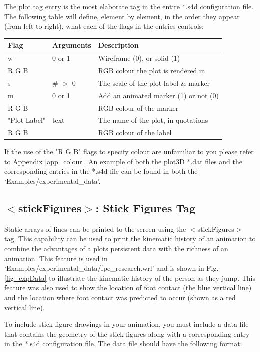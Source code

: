 \documentclass[singlecolumn,12pt]{article}
\begin{document}
The plot tag entry is the most elaborate tag in the entire *.s4d
configuration file. The following table will define, element by
element, in the order they appear (from left to right), what each of
the flags in the entries controls:

\vspace{1cm}
\begin{tabular}{l l l}
\hline Flag & Arguments  & Description \\
\hline w & 0 or 1 & Wireframe (0), or solid (1) \\
R G B & & RGB colour the plot is rendered in\\
s & \# $>$ 0 & The scale of the plot label \& marker \\
m & 0 or 1 & Add an animated marker (1) or not (0) \\
R G B & & RGB colour of the marker\\
"Plot Label" & text & The name of the plot, in quotations\\
R G B & & RGB colour of the label\\
\end{tabular}
\vspace{1cm}

If the use of the "R G B" flags to specify colour are unfamiliar to
you please refer to Appendix \ref{app_colour}. An example of both
the plot3D *.dat files and the corresponding entries in the *.s4d
file can be found in both the `Examples/experimental\_data'.

\subsection{$<$stickFigures$>$: Stick Figures Tag}

Static arrays of lines can be printed to the screen using the
$<$stickFigures$>$ tag. This capability can be used to print the
kinematic history of an animation to combine the advantages of a
plots persistent data with the richness of an animation. This
feature is used in `Examples/experimental\_data/fpe\_research.wrl'
and is shown in Fig. \ref{fig_expData} to illustrate the kinematic
history of the person as they jump. This feature was also used to
show the location of foot contact (the blue vertical line) and the
location where foot contact was predicted to occur (shown as a red
vertical line).

To include stick figure drawings in your animation, you must include
a data file that contains the geometry of the stick figures along
with a corresponding entry in the *.s4d configuration file. The data
file should have the following format:
\end{document}
